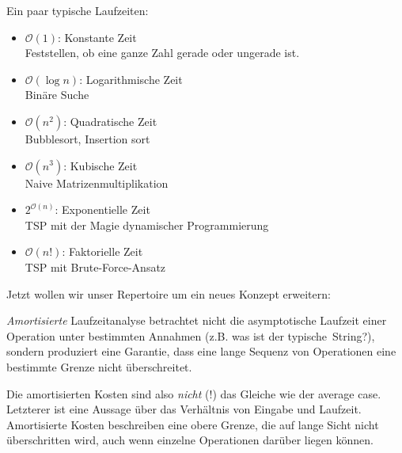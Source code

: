 \documentclass{beamer}
\begin{document}


\begin{frame}
Ein paar typische Laufzeiten:

\begin{itemize}
\item $\mathcal{O}(1)$: Konstante Zeit\\
Feststellen, ob eine ganze Zahl gerade oder ungerade ist.\pause
\item $\mathcal{O}(\log{}n)$: Logarithmische Zeit\\
Binäre Suche\pause
\item $\mathcal{O}(n^2)$: Quadratische Zeit\\
Bubblesort, Insertion sort\pause
\item $\mathcal{O}(n^3)$: Kubische Zeit\\
Naive Matrizenmultiplikation\pause
\item $2^{\mathcal{O}(n)}$: Exponentielle Zeit\\
TSP mit der Magie dynamischer Programmierung\pause
\item $\mathcal{O}(n!)$: Faktorielle Zeit\\
TSP mit Brute-Force-Ansatz
\end{itemize}
\end{frame}


\begin{frame}
Jetzt wollen wir unser Repertoire um ein neues Konzept erweitern:\smallskip\smallskip

\emph{Amortisierte} Laufzeitanalyse betrachtet nicht die asymptotische Laufzeit einer Operation unter bestimmten Annahmen (z.B. was ist der \glqq typische\grqq\ String?), sondern 
produziert eine Garantie, dass eine lange Sequenz von Operationen eine bestimmte Grenze nicht überschreitet.\pause\bigskip

Die amortisierten Kosten sind also \emph{nicht} (!) das Gleiche wie der average case. Letzterer ist eine Aussage über das Verhältnis von Eingabe und Laufzeit. Amortisierte Kosten beschreiben eine obere Grenze, die auf lange Sicht nicht überschritten wird, auch wenn einzelne Operationen darüber liegen können.
\end{frame}

\end{document}
